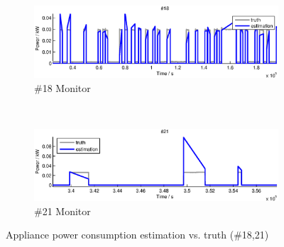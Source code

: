 \begin{figure}[p]
    \centering
    \begin{subfigure}[t]{\textwidth}
        \centering
        \includegraphics[width=\textwidth] {../../sw/pc/matlab/disagg-result/power-18.eps}
        \caption{\#18 Monitor}
    \end{subfigure} 
    \\
    \begin{subfigure}[t]{\textwidth}
        \centering
        \includegraphics[width=\textwidth] {../../sw/pc/matlab/disagg-result/power-21.eps}
        \caption{\#21 Monitor}
    \end{subfigure}
    \caption{Appliance power consumption estimation vs. truth (\#18,21)}\label{fig:power-18-21}
\end{figure}
